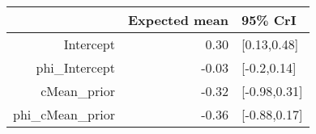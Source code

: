 \begin{tabular}{rrl}
  \hline
 & Expected mean & 95\% CrI \\ 
  \hline
Intercept & 0.30 & [0.13,0.48] \\ 
  phi\_Intercept & -0.03 & [-0.2,0.14] \\ 
  cMean\_prior & -0.32 & [-0.98,0.31] \\ 
  phi\_cMean\_prior & -0.36 & [-0.88,0.17] \\ 
   \hline
\end{tabular}

